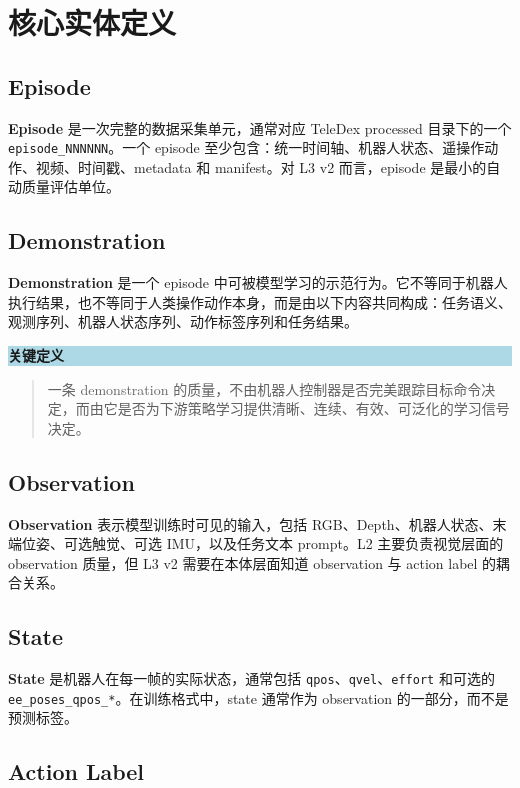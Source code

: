 \documentclass[UTF8,zihao=-4,oneside,openany]{ctexrep}
\newcommand{\Code}[1]{\texttt{#1}}
\newcommand{\Term}[1]{\textbf{#1}}
\newenvironment{notebox}[1]{\vspace{0.5em}\noindent\colorbox{LightBlue}{\parbox{0.96\linewidth}{\textbf{#1}}}\par\vspace{-0.2em}\begin{quote}\small}{\end{quote}\vspace{0.3em}}
\begin{document}
\section{核心实体定义}

\subsection{Episode}

\Term{Episode} 是一次完整的数据采集单元，通常对应 TeleDex processed 目录下的一个 \Code{episode\_NNNNNN}。一个 episode 至少包含：统一时间轴、机器人状态、遥操作动作、视频、时间戳、metadata 和 manifest。对 L3 v2 而言，episode 是最小的自动质量评估单位。

\subsection{Demonstration}

\Term{Demonstration} 是一个 episode 中可被模型学习的示范行为。它不等同于机器人执行结果，也不等同于人类操作动作本身，而是由以下内容共同构成：任务语义、观测序列、机器人状态序列、动作标签序列和任务结果。

\begin{notebox}{关键定义}
一条 demonstration 的质量，不由机器人控制器是否完美跟踪目标命令决定，而由它是否为下游策略学习提供清晰、连续、有效、可泛化的学习信号决定。
\end{notebox}

\subsection{Observation}

\Term{Observation} 表示模型训练时可见的输入，包括 RGB、Depth、机器人状态、末端位姿、可选触觉、可选 IMU，以及任务文本 prompt。L2 主要负责视觉层面的 observation 质量，但 L3 v2 需要在本体层面知道 observation 与 action label 的耦合关系。

\subsection{State}

\Term{State} 是机器人在每一帧的实际状态，通常包括 \Code{qpos}、\Code{qvel}、\Code{effort} 和可选的 \Code{ee\_poses\_qpos\_*}。在训练格式中，state 通常作为 observation 的一部分，而不是预测标签。

\subsection{Action Label}
\end{document}
